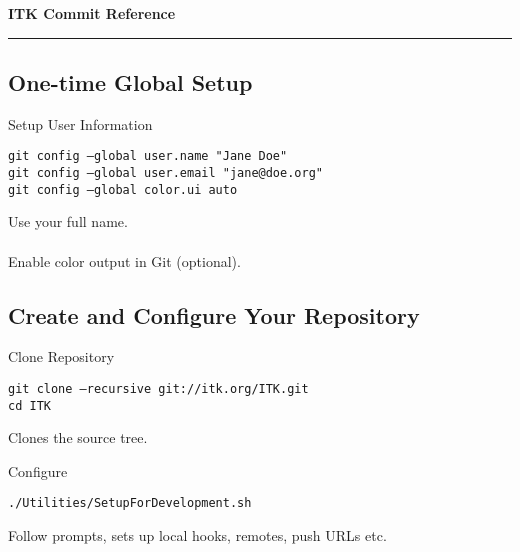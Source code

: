 \documentclass[10pt]{article}
\newlength{\cvsep}
\newlength{\cvtitles}
\newlength{\cvmain}
\newenvironment{category}[1]
  {\parbox[t]{\cvtitles}{\large\sc\centering #1}\hspace*{\cvsep}\begin{minipage}[t]{\cvmain}}
  {\end{minipage}\vspace*{0.35cm}}
\begin{document}
\pagestyle{empty}

{\centering
  \huge \bf ITK Commit Reference
  \vspace*{0.1cm}
  \hrule
}
\vspace*{0.3cm}

\subsection*{One-time Global Setup}
\begin{category}{Setup User Information}
\parbox[t]{0.6\cvmain}{%
\texttt{git config --global user.name "Jane Doe"\\
git config --global user.email "jane@doe.org"\\
git config --global color.ui auto}}
\parbox[t]{0.38\cvmain}{%
Use your full name.\\
\\
Enable color output in Git (optional).
}
\end{category}

\subsection*{Create and Configure Your Repository}
\begin{category}{Clone Repository}
\parbox[t]{0.6\cvmain}{%
  \texttt{git clone --recursive git://itk.org/ITK.git\\ cd ITK}
}
\parbox[t]{0.38\cvmain}{%
Clones the source tree.
}
\end{category}
\begin{category}{Configure}
\parbox[t]{0.6\cvmain}{%
  \texttt{./Utilities/SetupForDevelopment.sh}
}
\parbox[t]{0.38\cvmain}{%
Follow prompts, sets up local hooks, remotes, push URLs etc.
}
\end{category}
\end{document}
